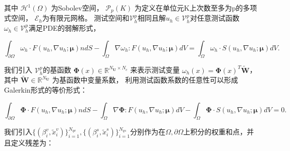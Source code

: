 其中 $\mathcal{H}^{1}(\Omega)$ 为Sobolev空间， $\mathcal{P}_{p}(K)$ 为定义在单位元K上次数至多为p的多项式空间， $\mathcal{E}_{h}$为有限元网格。
测试空间和$\mathcal{V}_{h}^{p}$相同且解$u_{h} \in \mathcal{V}_{h}^{p}$对任意测试函数$ \omega_{h} \in \mathcal{V}_{h}^{p}$满足PDE的弱解形式，

$$\int_{\partial \Omega} \omega_{h} \cdot F\left(u_{h}, \nabla u_{h} ; \boldsymbol{\mu}\right) n d S-\int_{\Omega} \nabla \omega_{h}: F\left(u_{h}, \nabla u_{h} ; \boldsymbol{\mu}\right) d V=\int_{\Omega} \omega_{h} \cdot S\left(u_{h}, \nabla u_{h} ; \boldsymbol{\mu}\right) d V .$$

我们引入 $\mathcal{V}_{h}^{p} $的基函数 $\boldsymbol{\Phi}(x) \in \mathbb{R}^{N_{\boldsymbol{U}} \times N_{c}}$  来表示测试变量 $\omega_{h}(x)=\boldsymbol{\Phi}(x)^{T} \tilde{\boldsymbol{W}}$， 
其中 $\tilde{\boldsymbol{W}} \in \mathbb{R}^{N_{\boldsymbol{U}}}$  为基函数中变量系数， 利用测试函数系数的任意性可以形成Galerkin形式的等价形式：

$$\int_{\partial \Omega} \boldsymbol{\Phi} \cdot F\left(u_{h}, \nabla u_{h} ; \boldsymbol{\mu}\right) n d S-\int_{\Omega} \nabla \boldsymbol{\Phi}: F\left(u_{h}, \nabla u_{h} ; \boldsymbol{\mu}\right) d V-\int_{\Omega} \boldsymbol{\Phi} \cdot S\left(u_{h}, \nabla u_{h} ; \boldsymbol{\mu}\right) d V=0 .$$

我们引入$\{(\beta^v_i,\tilde{x}_i^v)\}^{N_{qv}}_{i=1},\{(\beta^s_i,\tilde{x}_i^s)\}^{N_{qs}}_{i=1}$分别作为在$\Omega,\partial \Omega$上积分的权重和点，并且定义残差为：

